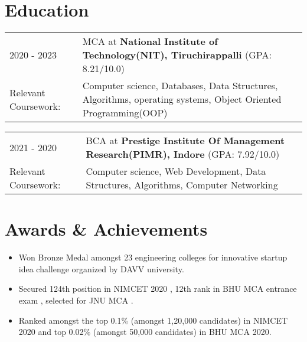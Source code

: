 \documentclass[a4paper,10pt]{article}
\newcommand{\customHeading}[1]{
    \section{\texorpdfstring{#1 \hrulefill}{}}
}
\begin{document}
\vspace{-1cm}
\customHeading{Education}
\begin{tabularx}{\linewidth}{@{}l X@{}}	
2020 - 2023 & MCA at \textbf{National Institute of Technology(NIT), Tiruchirappalli} \hfill \normalsize (GPA: 8.21/10.0) \\

Relevant Coursework: & Computer science, Databases, Data Structures, Algorithms, operating systems, Object Oriented Programming(OOP)
\end{tabularx}

\begin{tabularx}{\linewidth}{@{}l X@{}}	
2021 - 2020 & BCA at \textbf{Prestige Institute Of Management Research(PIMR), Indore} \hfill \normalsize (GPA: 7.92/10.0) \\

Relevant Coursework: & Computer science, Web Development, Data Structures, Algorithms, Computer Networking
\end{tabularx}

\customHeading{Awards \& Achievements}
\begin{minipage}[t]{\linewidth}
    \begin{itemize}[nosep,after=\strut, leftmargin=1em, itemsep=3pt]
        \item Won Bronze Medal amongst 23 engineering colleges for innovative startup idea challenge organized by DAVV university.
        \item Secured 124th position in NIMCET 2020 , 12th rank in BHU MCA entrance exam , selected for JNU MCA .
        \item  Ranked amongst the top 0.1\% (amongst 1,20,000 candidates) in NIMCET 2020 and top 0.02\% (amongst 50,000 candidates) in BHU MCA 2020.
        
    \end{itemize}
\end{minipage}





\vfill
\end{document}
